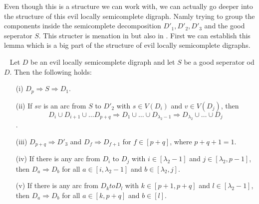 Even though this is a structure we can work with, we can actually go deeper into the structure of this evil locally semicomplete digraph. Namly trying to group the components inside the semicomplete decomposition $D'_1,D'_2,D'_3$ and the good seperator $S$. This structer is menation in \cite{bangJGT85} but also in \cite{tildeDMCS}. First we can establish this lemma which is a big part of the structure of evil locally semicomplete digraphs.
\begin{lemma}~\cite{tildeDMCS}
    Let $D$ be an evil locally semicomplete digraph and let $S$ be a good seperator od $D$. Then the following holds:
    \begin{itemize}
        \item[(i)] $D_p\Rightarrow S\Rightarrow D_1$.
        \item[(ii)] If $sv$ is an arc from $S$ to $D'_2$ with $s\in V(D_i)$ and $v\in V(D_j)$, then 
        \begin{equation*}
            D_i\cup D_{i+1}\cup \dots D_{p+q}\Rightarrow D_1\cup\dots \cup D_{\lambda_2-1}\Rightarrow D_{\lambda_2}\cup \dots \cup D_j
        \end{equation*}.
        \item[(iii)] $D_{p+q}\Rightarrow D'_3$ and $D_f\Rightarrow D_{f+1}$ for $f\in [p+q]$, where $p+q+1=1$.
        \item[(iv)] If there is any arc from $D_i$ to $D_j$ with $i\in [\lambda_2-1]$ and $j\in [\lambda_2,p-1]$, then $D_a\Rightarrow D_b$ for all $a\in [i,\lambda_2-1]$ and $b\in[\lambda_2,j]$.
        \item[(v)] If there is any arc from $D_k to D_l$ with $k\in [p+1,p+q]$ and $l\in [\lambda_2-1]$, then $D_a\Rightarrow D_b$ for all $a\in [k,p+q]$ and $b\in [l]$.   
    \end{itemize}
\end{lemma}
